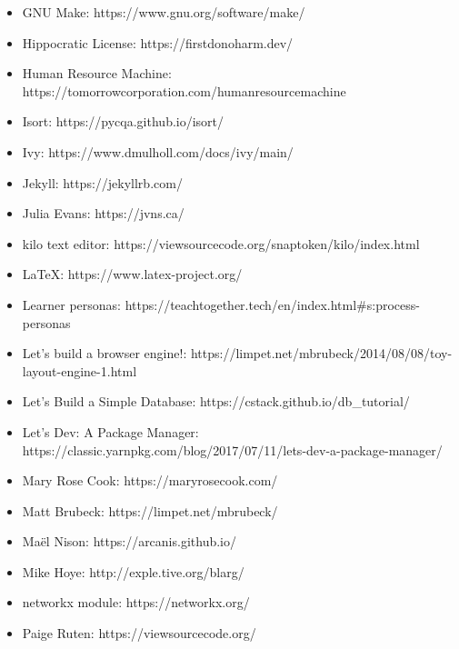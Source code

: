 \documentclass{scrbook}
\begin{document}
\begin{itemize}
\item GNU Make: https://www.gnu.org/software/make/

\item Hippocratic License: https://firstdonoharm.dev/

\item Human Resource Machine: https://tomorrowcorporation.com/humanresourcemachine

\item Isort: https://pycqa.github.io/isort/

\item Ivy: https://www.dmulholl.com/docs/ivy/main/

\item Jekyll: https://jekyllrb.com/

\item Julia Evans: https://jvns.ca/

\item kilo text editor: https://viewsourcecode.org/snaptoken/kilo/index.html

\item LaTeX: https://www.latex-project.org/

\item Learner personas: https://teachtogether.tech/en/index.html\#s:process-personas

\item Let's build a browser engine!: https://limpet.net/mbrubeck/2014/08/08/toy-layout-engine-1.html

\item Let's Build a Simple Database: https://cstack.github.io/db\_tutorial/

\item Let's Dev: A Package Manager: https://classic.yarnpkg.com/blog/2017/07/11/lets-dev-a-package-manager/

\item Mary Rose Cook: https://maryrosecook.com/

\item Matt Brubeck: https://limpet.net/mbrubeck/

\item Maël Nison: https://arcanis.github.io/

\item Mike Hoye: http://exple.tive.org/blarg/

\item networkx module: https://networkx.org/

\item Paige Ruten: https://viewsourcecode.org/


\end{itemize}
\end{document}
